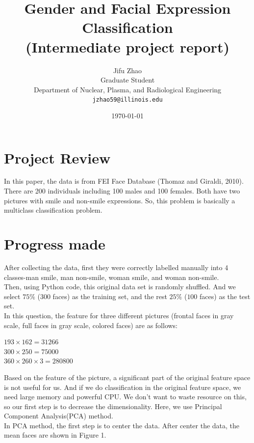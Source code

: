 \documentclass[11pt]{article}
\title{Gender and Facial Expression Classification \\ (Intermediate project report)}
\author{Jifu Zhao\\
  Graduate Student\\
  Department of Nuclear, Plasma, and Radiological Engineering \\
  {\tt jzhao59@illinois.edu} \\}
\date{\today}
\begin{document}
\maketitle

\section{Project Review}
In this paper, the data is from FEI Face Database (Thomaz and Giraldi, 2010). There are 200 individuals including 100 males and 100 females. Both have two pictures with smile and non-smile expressions. So, this problem is basically a multiclass classification problem.

\section{Progress made}
After collecting the data, first they were correctly labelled manually into 4 classes-man smile, man non-smile, woman smile, and woman non-smile.\\

Then, using Python code, this original data set is randomly shuffled. And we select $75\%$ ($300$ faces) as the training set, and the rest $25\%$ ($100$ faces) as the test set.\\

In this question, the feature for three different pictures (frontal faces in gray scale, full faces in gray scale, colored faces) are as follows:
\begin{center}
$193 \times 162 = 31266$\\
$300 \times 250 = 75000$\\
$360 \times 260 \times 3 = 280800$\\
\end{center}

Based on the feature of the picture, a significant part of the original feature space is not useful for us. And if we do classification in the original feature space, we need large memory and powerful CPU. We don't want to waste resource on this, so our first step is to decrease the dimensionality. Here, we use Principal Component Analysis(PCA) method.\\

In PCA method, the first step is to center the data. After center the data, the mean faces are shown in Figure 1.
\end{document}
